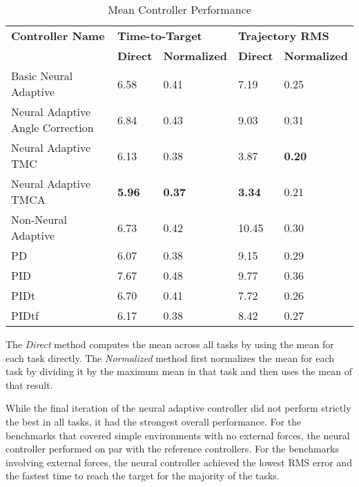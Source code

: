 \documentclass[letterpaper,12pt,titlepage,oneside,final]{book}
\begin{document}
\begin{table}
\begin{threeparttable}
\caption{Mean Controller Performance} \label{table:mean_task_ranking}
\begin{tabular}{| l | l | l | l | l |}
\hline
\textbf{Controller Name} & \multicolumn{2}{l|}{\textbf{Time-to-Target}} & \multicolumn{2}{l|}{\textbf{Trajectory RMS}} \\ \cline{2-5}
& \textbf{Direct} & \textbf{Normalized} & \textbf{Direct} & \textbf{Normalized} \\ \hline
Basic Neural Adaptive & 6.58 & 0.41 & 7.19 & 0.25 \\ \hline
Neural Adaptive Angle Correction & 6.84 & 0.43 & 9.03 & 0.31 \\ \hline
Neural Adaptive TMC & 6.13 & 0.38 & 3.87 & \textbf{0.20} \\ \hline
Neural Adaptive TMCA & \textbf{5.96} & \textbf{0.37} & \textbf{3.34} & 0.21 \\ \hline
Non-Neural Adaptive & 6.73 & 0.42 & 10.45 & 0.30 \\ \hline
PD & 6.07 & 0.38 & 9.15 & 0.29 \\ \hline
PID & 7.67 & 0.48 & 9.77 & 0.36 \\ \hline
PIDt & 6.70 & 0.41 & 7.72 & 0.26 \\ \hline
PIDtf & 6.17 & 0.38 & 8.42 & 0.27 \\ \hline
\end{tabular}
\begin{tablenotes}
\footnotesize
\item The \textit{Direct} method computes the mean across all tasks by using the mean for each task directly. The \textit{Normalized} method first normalizes the mean for each task by dividing it by the maximum mean in that task and then uses the mean of that result.
\end{tablenotes}
\end{threeparttable}
\end{table}

While the final iteration of the neural adaptive controller did not perform strictly the best in all tasks, it had the strongest overall performance.
For the benchmarks that covered simple environments with no external forces, the neural controller performed on par with the reference controllers.
For the benchmarks involving external forces, the neural controller achieved the lowest RMS error and the fastest time to reach the target for the majority of the tasks.
 
\end{document}
